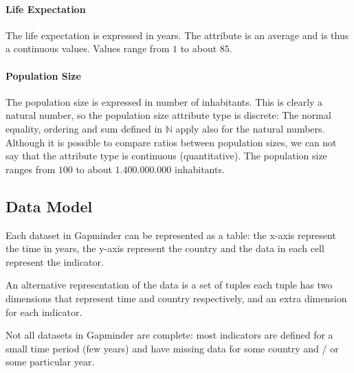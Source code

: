 \paragraph{Life Expectation}
The life expectation is expressed in years.
The attribute is an average and is thus a continuous values. 
Values range from $1$ to about $85$.

\paragraph{Population Size}
The population size is expressed in number of inhabitants.
This is clearly a natural number, so the population size attribute type is discrete:
The normal equality, ordering and sum defined in $\mathbb{N}$ apply also for the natural numbers.
Although it is possible to compare ratios between population sizes, we can not say that the attribute type is continuous (quantitative). 
The population size ranges from $100$ to about $1.400.000.000$ inhabitants.


\subsection{Data Model}


Each dataset in Gapminder can be represented as a table:
the x-axis represent the time in years, the y-axis represent the country and the data in each cell represent the indicator.

An alternative representation of the data is a set of tuples
each tuple has two dimensions that represent time and country respectively, and an extra dimension for each indicator.

Not all datasets in Gapminder are complete:
most indicators are defined for a small time period (few years) and have missing data for some country and / or some particular year.
